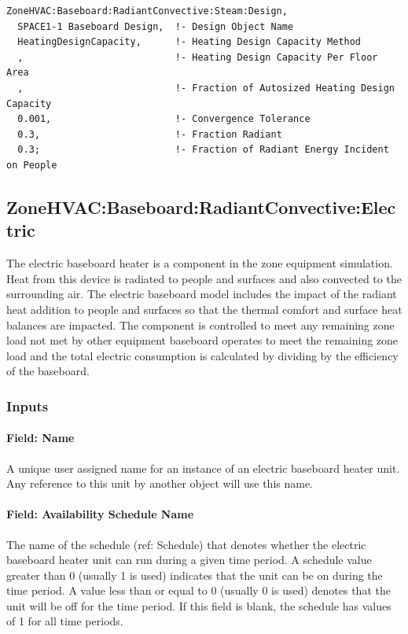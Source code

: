 \begin{lstlisting}
ZoneHVAC:Baseboard:RadiantConvective:Steam:Design,
  SPACE1-1 Baseboard Design,  !- Design Object Name
  HeatingDesignCapacity,      !- Heating Design Capacity Method
  ,                           !- Heating Design Capacity Per Floor Area
  ,                           !- Fraction of Autosized Heating Design Capacity
  0.001,                      !- Convergence Tolerance
  0.3,                        !- Fraction Radiant
  0.3;                        !- Fraction of Radiant Energy Incident on People
\end{lstlisting}

\subsection{ZoneHVAC:Baseboard:RadiantConvective:Electric}\label{zonehvacbaseboardradiantconvectiveelectric}

The electric baseboard heater is a component in the zone equipment simulation. Heat from this device is radiated to people and surfaces and also convected to the surrounding air. The electric baseboard model includes the impact of the radiant heat addition to people and surfaces so that the thermal comfort and surface heat balances are impacted. The component is controlled to meet any remaining zone load not met by other equipment baseboard operates to meet the remaining zone load and the total electric consumption is calculated by dividing by the efficiency of the baseboard.

\subsubsection{Inputs}\label{inputs-2-032}

\paragraph{Field: Name}\label{field-name-2-031}

A unique user assigned name for an instance of an electric baseboard heater unit. Any reference to this unit by another object will use this name.

\paragraph{Field: Availability Schedule Name}\label{field-availability-schedule-name-2-006}

The name of the schedule (ref: Schedule) that denotes whether the electric baseboard heater unit can run during a given time period. A schedule value greater than 0 (usually 1 is used) indicates that the unit can be on during the time period. A value less than or equal to 0 (usually 0 is used) denotes that the unit will be off for the time period. If this field is blank, the schedule has values of 1 for all time periods.

